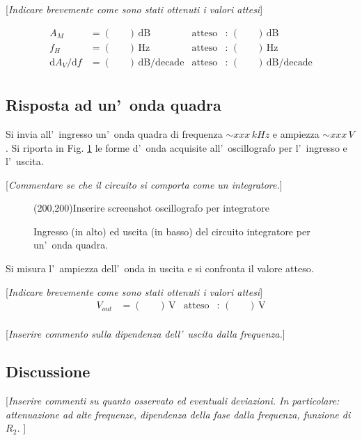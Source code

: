\documentclass[10pt,a4paper]{article}
\newcommand{\rem}[1]{[\emph{#1}]}
\newcommand{\exn}{\phantom{xxx}}
\begin{document}
\rem{Indicare brevemente come sono stati ottenuti i valori attesi}

\begin{align*}
A_M &= (\exn )\,\mathrm{dB} & \mathrm{atteso} &:\,(\exn  )\, \mathrm{dB}  \\
f_H &= (\exn )\,\mathrm{Hz} & \mathrm{atteso} &:\,(\exn  )\, \mathrm{Hz} \\
{\mathrm{d}A_V}/{\mathrm{d}f} &= (\exn )\,\mathrm{dB/decade} & \mathrm{atteso} &:\,(\exn  )\, \mathrm{dB/decade}  \\
\end{align*}


%
\subsection*{Risposta ad un'~onda quadra}
Si invia all'~ingresso un'~onda quadra di frequenza $\sim xxx\,kHz$ e ampiezza $\sim xxx\,V$.
Si riporta in Fig. \ref{fig:oscinte} le forme d'~onda acquisite all'~oscillografo per l'~ingresso
e l'~uscita. 

\rem{Commentare se che il circuito si comporta come un integratore.}
%
\begin{figure}[htb]
\begin{center}
\framebox(200,200){Inserire screenshot oscillografo per integratore}
\end{center}
\caption{\small Ingresso (in alto) ed uscita (in basso) del circuito integratore per un'~onda quadra.}
\label{fig:oscinte}
\end{figure}
%

Si misura l'~ampiezza dell'~onda  in uscita e si confronta il valore atteso.

\rem{Indicare brevemente come sono stati ottenuti i valori attesi}
\begin{align*}
V_{out} &= (\exn )\,\mathrm{V} & \mathrm{atteso} &:\,(\exn  )\, \mathrm{V}  \\
\end{align*}

\rem{Inserire commento sulla dipendenza dell'~uscita dalla frequenza.}
%

\subsection{Discussione}

\rem{Inserire commenti su quanto osservato ed eventuali deviazioni. 
In particolare: attenuazione ad alte frequenze, dipendenza della fase dalla frequenza, funzione di $R_2$. }

\end{document}
